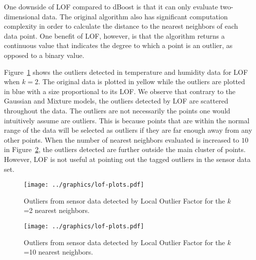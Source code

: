 One downside of LOF compared to dBoost is that it can only evaluate two-dimensional data.
The original algorithm also has significant computation complexity in order to calculate the distance to the nearest neighbors of each data point.
One benefit of LOF, however, is that the algorithm returns a continuous value that indicates the degree to which a point is an outlier, as opposed to a binary value.

Figure~\ref{fig:lof_2} shows the outliers detected in temperature and humidity data for LOF when $k=2$.
The original data is plotted in yellow while the outliers are plotted in blue with a size proportional to its LOF.
We observe that contrary to the Gaussian and Mixture models, the outliers detected by LOF are scattered throughout the data.
The outliers are not necessarily the points one would intuitively assume are outliers.
This is because points that are within the normal range of the data will be selected as outliers if they are far enough away from any other points.
When the number of nearest neighbors evaluated is increased to $10$ in Figure~\ref{fig:lof_10}, the outliers detected are further outside the main cluster of points.
However, LOF is not useful at pointing out the tagged outliers in the sensor data set.

\begin{figure}[h]
\centering
\texttt{[image: ../graphics/lof-plots.pdf]}
\caption{Outliers from sensor data detected by Local Outlier Factor for the $k$=2 nearest neighbors.}
\label{fig:lof_2}
\end{figure}
\begin{figure}[h]
\centering
\texttt{[image: ../graphics/lof-plots.pdf]}
\caption{Outliers from sensor data detected by Local Outlier Factor for the $k$=10 nearest neighbors.}
\label{fig:lof_10}
\end{figure}
